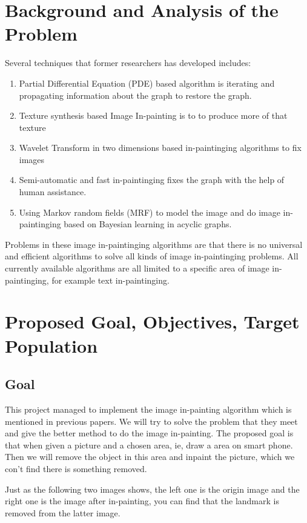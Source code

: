 \documentclass[12pt]{article}
\begin{document}
\section{Background and Analysis of the Problem}
Several techniques that former researchers has developed includes:
\begin{enumerate}[1.]
	\item Partial Differential Equation (PDE) based algorithm is iterating and propagating information about the graph to restore the graph.
	\item Texture synthesis based Image In-painting is to to produce more of that texture
	\item Wavelet Transform in two dimensions based in-paintinging algorithms to fix images
	\item Semi-automatic and fast in-paintinging fixes the graph with the help of human assistance.
	\item Using Markov random fields (MRF) to model the image and do image in-paintinging based on Bayesian learning in acyclic graphs.
\end{enumerate}
Problems in these image in-paintinging algorithms are that there is no universal and 
efficient algorithms to solve all kinds of image in-paintinging problems.
All currently available algorithms are all limited to a specific area of image
in-paintinging, for example text in-paintinging.





\section{Proposed Goal, Objectives, Target Population}
\subsection{Goal}
\qquad This project managed to implement the image in-painting algorithm which is mentioned in previous papers. We will try to solve the problem that they meet and give the better method to do the image in-painting. The proposed goal is that when given a picture and a chosen area, ie, draw a area on smart phone. Then we will remove the object in this area and inpaint the picture, which we con't find there is something removed.

\qquad Just as the following two images shows, the left one is the origin image and the right one is the image after in-painting, you can find that the landmark is removed from the latter image.
\end{document}
